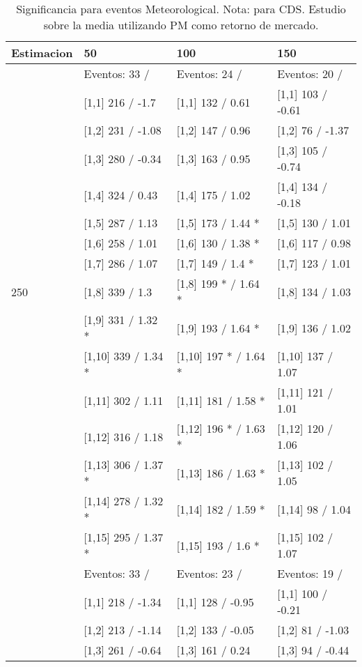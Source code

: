 \begin{table}

\caption{Significancia para eventos Meteorological. Nota: para CDS. Estudio sobre la media utilizando PM como retorno de mercado.}
\centering
\begin{tabular}[t]{llll}
\toprule
Estimacion & 50 & 100 & 150\\
\midrule
 & Eventos:  33 / & Eventos:  24 / & Eventos:  20 /\\
 & {}[1,1] 216  / -1.7 & {}[1,1] 132  / 0.61 & {}[1,1] 103  / -0.61\\
 & {}[1,2] 231  / -1.08 & {}[1,2] 147  / 0.96 & {}[1,2] 76  / -1.37\\
 & {}[1,3] 280  / -0.34 & {}[1,3] 163  / 0.95 & {}[1,3] 105  / -0.74\\
 & {}[1,4] 324  / 0.43 & {}[1,4] 175  / 1.02 & {}[1,4] 134  / -0.18\\
\addlinespace
 & {}[1,5] 287  / 1.13 & {}[1,5] 173  / 1.44 * & {}[1,5] 130  / 1.01\\
 & {}[1,6] 258  / 1.01 & {}[1,6] 130  / 1.38 * & {}[1,6] 117  / 0.98\\
 & {}[1,7] 286  / 1.07 & {}[1,7] 149  / 1.4 * & {}[1,7] 123  / 1.01\\
250 & {}[1,8] 339  / 1.3 & {}[1,8] 199 * / 1.64 * & {}[1,8] 134  / 1.03\\
 & {}[1,9] 331  / 1.32 * & {}[1,9] 193  / 1.64 * & {}[1,9] 136  / 1.02\\
\addlinespace
 & {}[1,10] 339  / 1.34 * & {}[1,10] 197 * / 1.64 * & {}[1,10] 137  / 1.07\\
 & {}[1,11] 302  / 1.11 & {}[1,11] 181  / 1.58 * & {}[1,11] 121  / 1.01\\
 & {}[1,12] 316  / 1.18 & {}[1,12] 196 * / 1.63 * & {}[1,12] 120  / 1.06\\
 & {}[1,13] 306  / 1.37 * & {}[1,13] 186  / 1.63 * & {}[1,13] 102  / 1.05\\
 & {}[1,14] 278  / 1.32 * & {}[1,14] 182  / 1.59 * & {}[1,14] 98  / 1.04\\
\addlinespace
 & {}[1,15] 295  / 1.37 * & {}[1,15] 193  / 1.6 * & {}[1,15] 102  / 1.07\\
 & Eventos:  33 / & Eventos:  23 / & Eventos:  19 /\\
 & {}[1,1] 218  / -1.34 & {}[1,1] 128  / -0.95 & {}[1,1] 100  / -0.21\\
 & {}[1,2] 213  / -1.14 & {}[1,2] 133  / -0.05 & {}[1,2] 81  / -1.03\\
 & {}[1,3] 261  / -0.64 & {}[1,3] 161  / 0.24 & {}[1,3] 94  / -0.44\\

\end{tabular}
\end{table}
